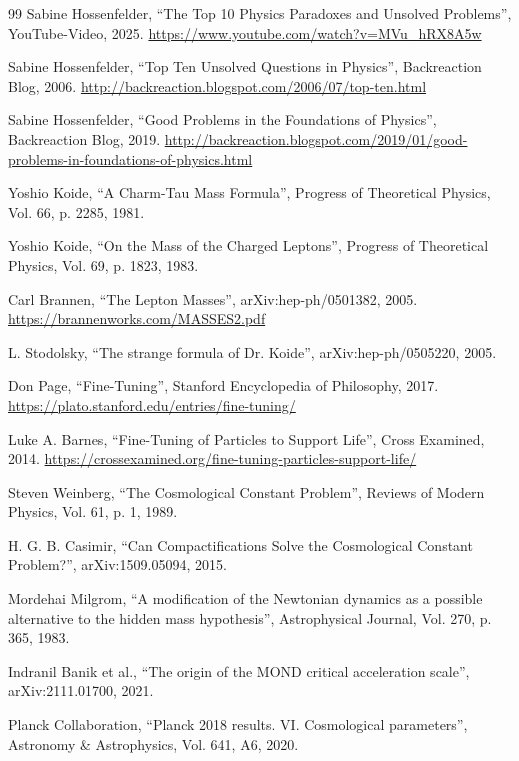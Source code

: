 	\begin{thebibliography}{99}
		 Sabine Hossenfelder, ``The Top 10 Physics Paradoxes and Unsolved Problems'', YouTube-Video, 2025. \url{https://www.youtube.com/watch?v=MVu_hRX8A5w}
		
		 Sabine Hossenfelder, ``Top Ten Unsolved Questions in Physics'', Backreaction Blog, 2006. \url{http://backreaction.blogspot.com/2006/07/top-ten.html}
		
		 Sabine Hossenfelder, ``Good Problems in the Foundations of Physics'', Backreaction Blog, 2019. \url{http://backreaction.blogspot.com/2019/01/good-problems-in-foundations-of-physics.html}
		
		 Yoshio Koide, ``A Charm-Tau Mass Formula'', Progress of Theoretical Physics, Vol. 66, p. 2285, 1981.
		
		 Yoshio Koide, ``On the Mass of the Charged Leptons'', Progress of Theoretical Physics, Vol. 69, p. 1823, 1983.
		
		 Carl Brannen, ``The Lepton Masses'', arXiv:hep-ph/0501382, 2005. \url{https://brannenworks.com/MASSES2.pdf}
		
		 L. Stodolsky, ``The strange formula of Dr. Koide'', arXiv:hep-ph/0505220, 2005.
		
		 Don Page, ``Fine-Tuning'', Stanford Encyclopedia of Philosophy, 2017. \url{https://plato.stanford.edu/entries/fine-tuning/}
		
		 Luke A. Barnes, ``Fine-Tuning of Particles to Support Life'', Cross Examined, 2014. \url{https://crossexamined.org/fine-tuning-particles-support-life/}
		
		 Steven Weinberg, ``The Cosmological Constant Problem'', Reviews of Modern Physics, Vol. 61, p. 1, 1989.
		
		 H. G. B. Casimir, ``Can Compactifications Solve the Cosmological Constant Problem?'', arXiv:1509.05094, 2015.
		
		 Mordehai Milgrom, ``A modification of the Newtonian dynamics as a possible alternative to the hidden mass hypothesis'', Astrophysical Journal, Vol. 270, p. 365, 1983.
		
		 Indranil Banik et al., ``The origin of the MOND critical acceleration scale'', arXiv:2111.01700, 2021.
		
		 Planck Collaboration, ``Planck 2018 results. VI. Cosmological parameters'', Astronomy \& Astrophysics, Vol. 641, A6, 2020.
		

\end{thebibliography}
